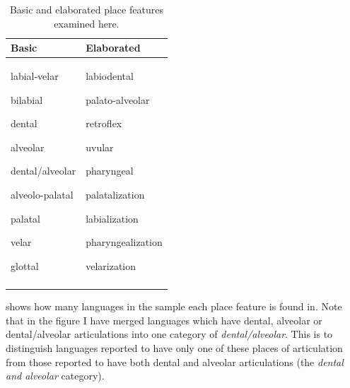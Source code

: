 \begin{table}[t]
\begin{tabularx}{\textwidth}{QQ}
\lsptoprule
Basic & Elaborated\\\midrule
labial-velar

bilabial

dental

alveolar

dental/alveolar

alveolo-palatal

palatal

velar

glottal & labiodental

palato-alveolar

retroflex

uvular

pharyngeal

palatalization

labialization

pharyngealization

velarization\\
\lspbottomrule
\end{tabularx}
\caption{\label{tab:4.13}Basic and elaborated place features examined here.}
\end{table}

   shows how many languages in the sample each place feature is found in. Note that in the figure I have merged languages which have dental, alveolar or dental/alveolar articulations into one category of \textit{dental/alveolar}. This is to distinguish languages reported to have only one of these places of articulation from those reported to have both dental and alveolar articulations (the \textit{dental and alveolar} category).


